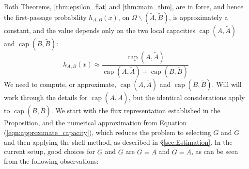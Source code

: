 \documentclass[12pt, nofootinbib,english, amsmath, amssymb, aps, priprint, graphicx,floatfix]{revtex4-1}
\theoremstyle{plain}
\theoremstyle{definition}
\theoremstyle{plain}
\newcommand{\capac}[2]{\ensuremath{\operatorname{cap}}(#1,#2)}
\newcommand{\dA}{{\dot A}}
\newcommand{\tA}{{\tilde A}}
\newcommand{\tB}{{\tilde B}}
\begin{document}
Both Theorems, \ref{thm:epsilon_flat} and \ref{thm:main_thm}, are in force, and hence the first-passage probability $h_{A,B}(x)$, on $\Omega\backslash(\tA,\tB)$, is approximately a constant, and the value depends only on the two local capacities $\capac{A}{\tA}$ and
$\capac{B}{\tB}$:
\[
 h_{A,B} (x) \approx \frac{\capac{A}{\tilde A}}{\capac{A}{\tilde A}+\capac{B}{\tilde B}}
 \]
We need to compute, or approximate, $\capac{A}{\tA}$ and $\capac{B}{\tB}$. Will will work through the details for $\capac{A}{\tA}$, but the identical considerations apply to 
$\capac{B}{\tilde B}$.  We start with the flux representation
established in the Proposition, and the numerical approximation from Equation (\ref{eqn:approximate_capacity}), which reduces the problem to selecting $G$ and $\tilde G$ and then applying the shell method, as described in \S\ref{sec:Estimation}.
In the current setup, 
good choices for $G$ and $\tilde G$ are $G=\dA$ and 
$\tilde G = \tA$, as can be seen from the following observations:
\end{document}
